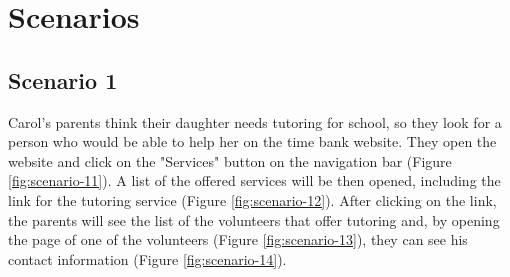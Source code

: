 \documentclass[a4paper, 11pt, parskip=half, headsepline]{scrreprt}
\begin{document}
\chapter{Scenarios}

\section{Scenario 1}

Carol's parents think their daughter needs tutoring for school, so they look for a person who would be able to help her on the time bank website. They open the website and click on the "Services" button on the navigation bar (Figure \ref{fig:scenario-11}). A list of the offered services will be then opened, including the link for the tutoring service (Figure \ref{fig:scenario-12}). After clicking on the link, the parents will see the list of the volunteers that offer tutoring and, by opening the page of one of the volunteers (Figure \ref{fig:scenario-13}), they can see his contact information (Figure \ref{fig:scenario-14}).
\end{document}
